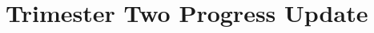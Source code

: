 \documentclass[12pt,a4paper]{article} %
\begin{document}



\newpage
\section{Trimester Two Progress Update}
\end{document}
